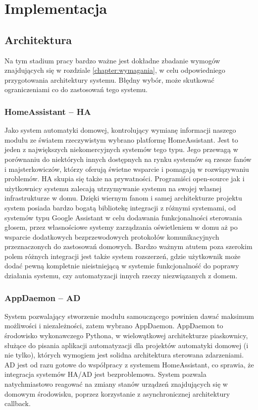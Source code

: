 \chapter{Implementacja}

\section{Architektura}
Na tym stadium pracy bardzo ważne jest dokładne zbadanie wymogów znajdujących się w rozdziale \ref{chapter:wymagania}, w celu odpowiedniego przygotowania architektury systemu. Błędny wybór, może skutkować ograniczeniami co do zastosowań tego systemu.

\subsection{HomeAssistant -- HA}
Jako system automatyki domowej, kontrolujący wymianę informacji naszego modułu ze światem rzeczywistym wybrano platformę HomeAssistant. Jest to jeden z największych niekomercyjnych systemów tego typu. Jego przewagą w porównaniu do niektórych innych dostępnych na rynku systemów są rzesze fanów i majsterkowiczów, którzy oferują świetne wsparcie i pomagają w rozwiązywaniu problemów. HA skupia się także na prywatności. Programiści open-source jak i użytkownicy systemu zalecają utrzymywanie systemu na swojej własnej infrastrukturze w domu. Dzięki wiernym fanom i samej architekturze projektu system posiada bardzo bogatą bibliotekę integracji z różnymi systemami, od systemów typu Google Assistant w celu dodawania funkcjonalności sterowania głosem, przez własnościowe systemy zarządzania oświetleniem w domu aż po wsparcie dodatkowych bezprzewodowych protokołów komunikacyjnych przeznaczonych do zastosowań domowych. Bardzo ważnym atutem poza szerokim polem różnych integracji jest także system rozszerzeń, gdzie użytkownik może dodać pewną kompletnie nieistniejącą w systemie funkcjonalność do poprawy działania systemu, czy automatyzacji innych rzeczy niezwiązanych z domem.


\subsection{AppDaemon -- AD}
System pozwalający stworzenie modułu samouczącego powinien dawać maksimum możliwości i niezależności, zatem wybrano AppDaemon. AppDaemon to środowisko wykonawczego Pythona, w wielowątkowej architekturze piaskownicy, służące do pisania aplikacji automatyzacji dla projektów automatyki domowej (i nie tylko), których wymogiem jest solidna architektura sterowana zdarzeniami. AD jest od razu gotowe do współpracy z systemem HomeAssistant, co sprawia, że integracja systemów HA/AD jest bezproblemowa. System pozwala natychmiastowo reagować na zmiany stanów urządzeń znajdujących się w domowym środowisku, poprzez korzystanie z asynchronicznej architektury callback.

